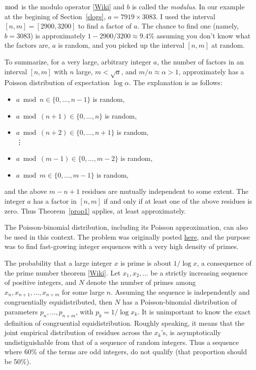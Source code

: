 \documentclass[10pt]{article}
\begin{document}
$\bmod$ is the modulo operator [\href{https://en.wikipedia.org/wiki/Modulo_operation}{Wiki}] and $b$ is called the {\em modulus}. In our example at the begining of Section~\ref{slogs}, $a=7919 \times 3083$.
 I used the interval $[n,m]=[2900,3200]$ to find a factor of $a$. The chance to find one (namely, $b=3083$) is approximately $1-2900/3200\approx 9.4\%$ assuming you don't know what the factors are, $a$ is random, and you picked up the interval $[n,m]$ at random. 

To summarize, for a very large, arbitrary integer $a$, the number of factors in an interval $[n, m]$ with $n$ large, $m<\sqrt{a}$, and $m/n\approx\alpha>1$, approximately has a Poisson distribution of expectation $\log\alpha$. The explanation is as follows:
\begin{itemize}
\item $a \bmod{n}\in \{0,\dots, n-1\}$ is random, 
\item $a \bmod{(n+1)}\in \{0,\dots, n\}$ is random, 
\item $a \bmod{(n+2)}\in \{0, \dots,n+1\}$ is random,\\
  \vdots 
\item $a \bmod{(m-1)}\in \{0,\dots,m-2\}$ is random, 
\item $a \bmod{m}\in \{0,\dots,m-1\}$ is random, 
\end{itemize}
and the above $m-n+1$ residues are mutually independent to some extent. The integer $a$ has a factor in $[n,m]$ if and only if at least one of the above residues is zero. Thus Theorem~\ref{prop1} applies, at least approximately. \\


\noindent The Poisson-binomial distribution, including its Poisson approximation, can also be used in this context. The problem was originally posted \href{https://mathoverflow.net/questions/374305/sequences-with-high-densities-of-primes-how-to-boost-them-to-get-even-more-and}{here}, and the purpose was to find fast-growing integer sequences with a very high density of primes.

The probability that a large integer $x$ is prime is about $1/\log x$, a consequence of the prime number theorem [\href{https://en.wikipedia.org/wiki/Prime_number_theorem}{Wiki}]. Let
 $x_1,x_2,\dots$ be a strictly increasing sequence of positive integers, and $N$ denote the number of primes among $x_n,x_{n+1},\dots,x_{n+m}$ for some large $n$. Assuming the sequence is independently and congruentially equidistributed, then $N$ has a Poisson-binomial distribution of parameters $p_n,\dots,p_{n+m}$, with $p_k=1/\log x_k$. It is unimportant to know the exact definition of congruential equidistribution. Roughly speaking, it means that the joint empirical distribution of residues across the $x_k$'s, is asymptotically undistiguishable from that of a sequence of random integers. Thus a sequence where 60\% of the terms are odd integers, do not qualify (that proportion should be 50\%). 
\end{document}
